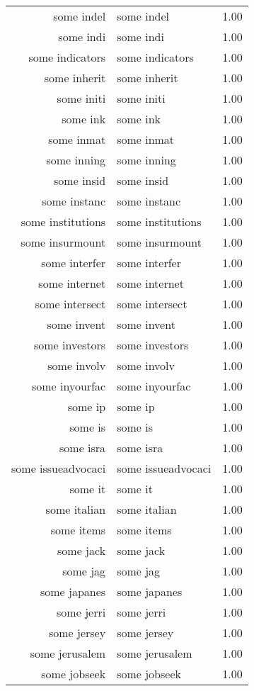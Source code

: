 \begin{table}[ht]
\begin{tabular}{rlr}
  some indel & some indel & 1.00 \\ 
  some indi & some indi & 1.00 \\ 
  some indicators & some indicators & 1.00 \\ 
  some inherit & some inherit & 1.00 \\ 
  some initi & some initi & 1.00 \\ 
  some ink & some ink & 1.00 \\ 
  some inmat & some inmat & 1.00 \\ 
  some inning & some inning & 1.00 \\ 
  some insid & some insid & 1.00 \\ 
  some instanc & some instanc & 1.00 \\ 
  some institutions & some institutions & 1.00 \\ 
  some insurmount & some insurmount & 1.00 \\ 
  some interfer & some interfer & 1.00 \\ 
  some internet & some internet & 1.00 \\ 
  some intersect & some intersect & 1.00 \\ 
  some invent & some invent & 1.00 \\ 
  some investors & some investors & 1.00 \\ 
  some involv & some involv & 1.00 \\ 
  some inyourfac & some inyourfac & 1.00 \\ 
  some ip & some ip & 1.00 \\ 
  some is & some is & 1.00 \\ 
  some isra & some isra & 1.00 \\ 
  some issueadvocaci & some issueadvocaci & 1.00 \\ 
  some it & some it & 1.00 \\ 
  some italian & some italian & 1.00 \\ 
  some items & some items & 1.00 \\ 
  some jack & some jack & 1.00 \\ 
  some jag & some jag & 1.00 \\ 
  some japanes & some japanes & 1.00 \\ 
  some jerri & some jerri & 1.00 \\ 
  some jersey & some jersey & 1.00 \\ 
  some jerusalem & some jerusalem & 1.00 \\ 
  some jobseek & some jobseek & 1.00 \\ 

\end{tabular}
\end{table}
